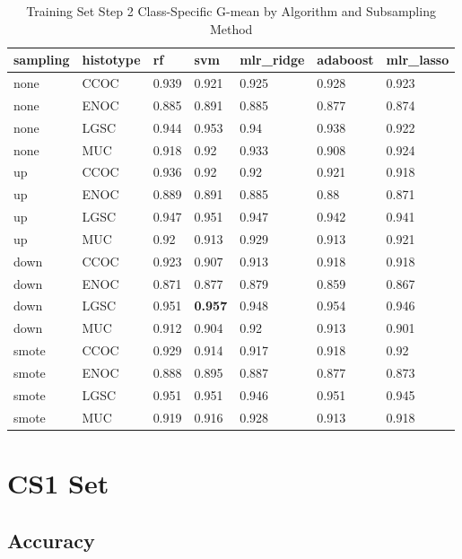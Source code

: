 \documentclass[
]{report}
\begin{document}
\begin{table}

\caption{\label{tab:train-step2-gmean-class-table}Training Set Step 2 Class-Specific G-mean by Algorithm and Subsampling Method}
\centering
\begin{tabular}[t]{l|l|l|l|l|l|l}
\hline
sampling & histotype & rf & svm & mlr\_ridge & adaboost & mlr\_lasso\\
\hline
none & CCOC & 0.939 & 0.921 & 0.925 & 0.928 & 0.923\\
\hline
none & ENOC & 0.885 & 0.891 & 0.885 & 0.877 & 0.874\\
\hline
none & LGSC & 0.944 & 0.953 & 0.94 & 0.938 & 0.922\\
\hline
none & MUC & 0.918 & 0.92 & 0.933 & 0.908 & 0.924\\
\hline
up & CCOC & 0.936 & 0.92 & 0.92 & 0.921 & 0.918\\
\hline
up & ENOC & 0.889 & 0.891 & 0.885 & 0.88 & 0.871\\
\hline
up & LGSC & 0.947 & 0.951 & 0.947 & 0.942 & 0.941\\
\hline
up & MUC & 0.92 & 0.913 & 0.929 & 0.913 & 0.921\\
\hline
down & CCOC & 0.923 & 0.907 & 0.913 & 0.918 & 0.918\\
\hline
down & ENOC & 0.871 & 0.877 & 0.879 & 0.859 & 0.867\\
\hline
down & LGSC & 0.951 & \textbf{0.957} & 0.948 & 0.954 & 0.946\\
\hline
down & MUC & 0.912 & 0.904 & 0.92 & 0.913 & 0.901\\
\hline
smote & CCOC & 0.929 & 0.914 & 0.917 & 0.918 & 0.92\\
\hline
smote & ENOC & 0.888 & 0.895 & 0.887 & 0.877 & 0.873\\
\hline
smote & LGSC & 0.951 & 0.951 & 0.946 & 0.951 & 0.945\\
\hline
smote & MUC & 0.919 & 0.916 & 0.928 & 0.913 & 0.918\\
\hline
\end{tabular}
\end{table}

\hypertarget{cs1-set}{%
\section{CS1 Set}\label{cs1-set}}

\hypertarget{accuracy-2}{%
\subsection{Accuracy}\label{accuracy-2}}
\end{document}
